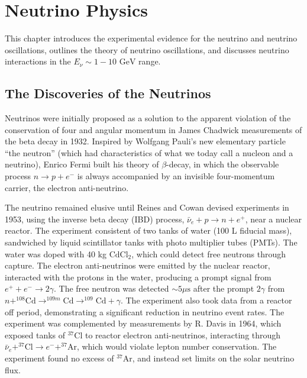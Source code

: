 \chapter{Neutrino Physics}
\label{chap:theory}
This chapter introduces the experimental evidence for the neutrino and neutrino oscillations, outlines the theory of neutrino oscillations, and discusses neutrino interactions in the $E_\nu\sim1-10 \text{ GeV}$ range.

\section{The Discoveries of the Neutrinos}
Neutrinos were initially proposed as a solution to the apparent violation of the conservation of four and angular momentum in James Chadwick measurements of the beta decay in 1932\cite{Chadwick1,Chadwick2}. Inspired by Wolfgang Pauli's new elementary particle ``the neutron'' (which had characteristics of what we today call a nucleon and a neutrino)\cite{pauli_1933}, Enrico Fermi built his theory of $\beta$-decay\cite{fermi_1934}, in which the observable process $n \rightarrow p + e^-$ is always accompanied by an invisible four-momentum carrier, the electron anti-neutrino.

The neutrino remained elusive until Reines and Cowan devised experiments\cite{reines_cowan_1,reines_cowan_2} in 1953, using the inverse beta decay (IBD) process, $\bar{\nu}_e + p \rightarrow n + e^+$, near a nuclear reactor. The experiment consistent of two tanks of water (100 L fiducial mass), sandwiched by liquid scintillator tanks with photo multiplier tubes (PMTs). The water was doped with 40 kg $\text{CdCl}_2$, which could detect free neutrons through capture. The electron anti-neutrinos were emitted by the nuclear reactor, interacted with the protons in the water, producing a prompt signal from $e^+ + e^- \rightarrow 2\gamma$. The free neutron was detected $\sim5\mu\text{s}$ after the prompt $2\gamma$ from $n + ^{108}\text{Cd} \rightarrow ^{109m}\text{Cd} \rightarrow ^{109}\text{Cd} + \gamma$. The experiment also took data from a reactor off period, demonstrating a significant reduction in neutrino event rates. The experiment was complemented by measurements by R. Davis\cite{davis} in 1964, which exposed tanks of $^{37}\text{Cl}$ to reactor electron anti-neutrinos, interacting through $\bar{\nu}_e + ^{37}\text{Cl} \rightarrow e^- + ^{37}\text{Ar}$, which would violate lepton number conservation. The experiment found no excess of $^{37}\text{Ar}$, and instead set limits on the solar neutrino flux.

